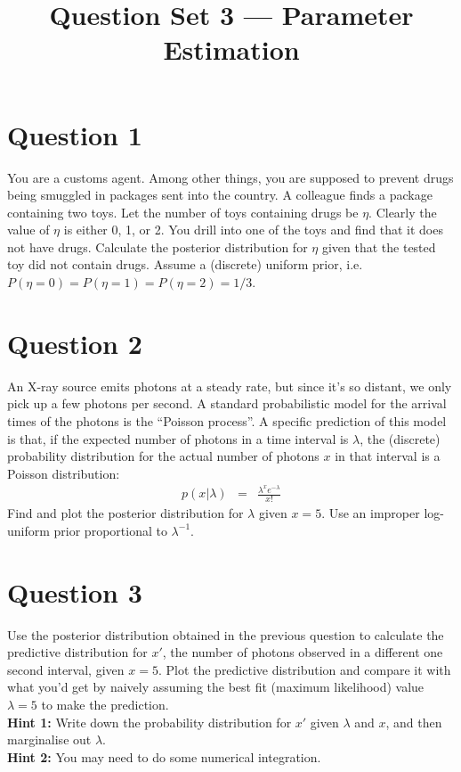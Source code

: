 \documentclass[a4paper, 12pt]{article}
\title{Question Set 3 --- Parameter Estimation}
\author{}
\date{}
\begin{document}
\maketitle


\setlength{\parindent}{0pt}
\setlength{\parskip}{8pt}

\section*{Question 1}
You are a customs agent. Among other things, you are supposed to prevent
drugs being smuggled in packages sent into the country. A colleague finds a
package containing two toys. Let the number of toys containing drugs be
$\eta$. Clearly the value of $\eta$ is either 0, 1, or 2. You drill into
one of the toys and find that it does not have drugs.
Calculate the posterior distribution for $\eta$ given that the tested
toy did not contain drugs. Assume a (discrete) uniform prior, i.e.
$P(\eta=0) = P(\eta=1) = P(\eta=2) = 1/3$.

\section*{Question 2}
An X-ray source emits photons at a steady rate, but since it's so distant, we
only pick up a few photons per second.
A standard probabilistic model for the arrival times of the photons is the
``Poisson process''. A specific prediction of this model is that, if the
expected number of photons in a time interval
is $\lambda$, the (discrete) probability distribution for the actual number of photons $x$ in that interval is a Poisson distribution:
\begin{eqnarray}
p(x | \lambda) &=& \frac{\lambda^x e^{-\lambda}}{x!}
\end{eqnarray}
Find and plot the posterior distribution for $\lambda$ given $x=5$. Use an improper
log-uniform prior proportional to $\lambda^{-1}$.

\section*{Question 3}
Use the posterior distribution obtained in the previous question to calculate
the predictive distribution for $x'$, the number of photons observed in a
different one second interval, given $x=5$. Plot the predictive distribution
and compare it with what you'd get by naively assuming the best fit
(maximum likelihood) value $\lambda=5$ to make the prediction.\\

{\bf Hint 1: }Write down the probability distribution for $x'$ given
$\lambda$ and $x$, and then marginalise out $\lambda$.\\

{\bf Hint 2: }You may need to do some numerical integration.
\end{document}
